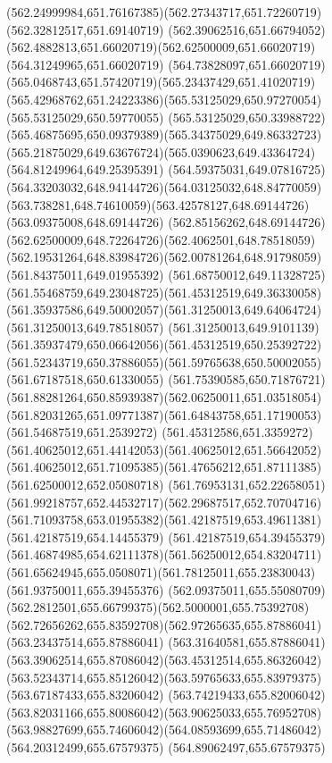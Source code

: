 {{	\curveto(562.24999984,651.76167385)(562.27343717,651.72260719)(562.32812517,651.69140719)
	\curveto(562.39062516,651.66794052)(562.4882813,651.66020719)(562.62500009,651.66020719)
	\lineto(564.31249965,651.66020719)
	\curveto(564.73828097,651.66020719)(565.0468743,651.57420719)(565.23437429,651.41020719)
	\curveto(565.42968762,651.24223386)(565.53125029,650.97270054)(565.53125029,650.59770055)
	\curveto(565.53125029,650.33988722)(565.46875695,650.09379389)(565.34375029,649.86332723)
	\curveto(565.21875029,649.63676724)(565.0390623,649.43364724)(564.81249964,649.25395391)
	\curveto(564.59375031,649.07816725)(564.33203032,648.94144726)(564.03125032,648.84770059)
	\curveto(563.738281,648.74610059)(563.42578127,648.69144726)(563.09375008,648.69144726)
	\curveto(562.85156262,648.69144726)(562.62500009,648.72264726)(562.4062501,648.78518059)
	\curveto(562.19531264,648.83984726)(562.00781264,648.91798059)(561.84375011,649.01955392)
	\curveto(561.68750012,649.11328725)(561.55468759,649.23048725)(561.45312519,649.36330058)
	\curveto(561.35937586,649.50002057)(561.31250013,649.64064724)(561.31250013,649.78518057)
	\curveto(561.31250013,649.9101139)(561.35937479,650.06642056)(561.45312519,650.25392722)
	\curveto(561.52343719,650.37886055)(561.59765638,650.50002055)(561.67187518,650.61330055)
	\curveto(561.75390585,650.71876721)(561.88281264,650.85939387)(562.06250011,651.03518054)
	\curveto(561.82031265,651.09771387)(561.64843758,651.17190053)(561.54687519,651.2539272)
	\curveto(561.45312586,651.3359272)(561.40625012,651.44142053)(561.40625012,651.56642052)
	\curveto(561.40625012,651.71095385)(561.47656212,651.87111385)(561.62500012,652.05080718)
	\curveto(561.76953131,652.22658051)(561.99218757,652.44532717)(562.29687517,652.70704716)
	\curveto(561.71093758,653.01955382)(561.42187519,653.49611381)(561.42187519,654.14455379)
	\curveto(561.42187519,654.39455379)(561.46874985,654.62111378)(561.56250012,654.83204711)
	\curveto(561.65624945,655.0508071)(561.78125011,655.23830043)(561.93750011,655.39455376)
	\curveto(562.09375011,655.55080709)(562.2812501,655.66799375)(562.5000001,655.75392708)
	\curveto(562.72656262,655.83592708)(562.97265635,655.87886041)(563.23437514,655.87886041)
	\curveto(563.31640581,655.87886041)(563.39062514,655.87086042)(563.45312514,655.86326042)
	\curveto(563.52343714,655.85126042)(563.59765633,655.83979375)(563.67187433,655.83206042)
	\curveto(563.74219433,655.82006042)(563.82031166,655.80086042)(563.90625033,655.76952708)
	\curveto(563.98827699,655.74606042)(564.08593699,655.71486042)(564.20312499,655.67579375)
	\lineto(564.89062497,655.67579375)
}}
